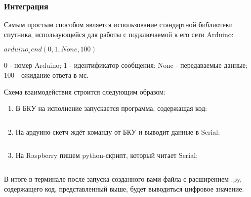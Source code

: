 
\subsubsection*{Интеграция}

Самым простым способом является использование стандартной библиотеки спутника, использующейся для работы с подключаемой к его сети Arduino:

$arduino_send(0, 1, None, 100)$

0 - номер Arduino;
1 - идентификатор сообщения;
None - передаваемые данные;
100 - ожидание ответа в мс.

Схема взаимодействия строится следующим образом:

\begin{enumerate}
    \item В БКУ на исполнение запускается программа, содержащая код:
    \inputminted[fontsize=\footnotesize, linenos]{python}{final/command_tour/dzz/task_02/source_5.py}
    \item На ардуино скетч ждёт команду от БКУ и выводит данные в Serial:
    \inputminted[fontsize=\footnotesize, linenos]{cpp}{final/command_tour/dzz/task_02/source_6.cpp}
    \item На Raspberry пишем python-скрипт, который читает Serial:
    \inputminted[fontsize=\footnotesize, linenos]{python}{final/command_tour/dzz/task_02/source_7.py}
\end{enumerate}

В итоге в терминале после запуска созданного вами файла с расширением .py, содержащего код, представленный выше, будет выводиться цифровое значение.